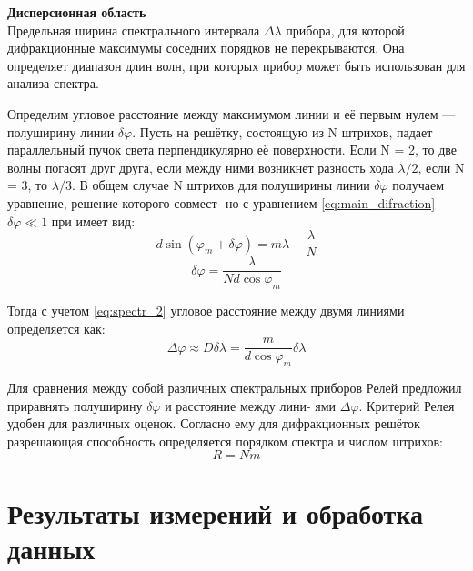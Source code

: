 \textbf{Дисперсионная область}\\
\indent Предельная ширина спектрального интервала $\Delta \lambda$ прибора, для которой дифракционные максимумы соседних порядков не перекрываются. Она определяет диапазон длин волн, при которых прибор может быть использован для
анализа спектра.

\indent Определим угловое расстояние между максимумом линии и её первым нулем — полуширину линии $\delta \varphi$. Пусть на решётку, состоящую из N штрихов, падает параллельный пучок света перпендикулярно её поверхности. Если
N = 2, то две волны погасят друг друга, если между ними возникнет
разность хода $\lambda/2$, если N = 3, то $\lambda/3$. В общем случае N штрихов для полуширины линии $\delta \varphi$ получаем уравнение, решение которого совмест-
но с уравнением \ref{eq:main_difraction} $\delta \varphi \ll 1$ при имеет вид:
\begin{equation}
    d\sin(\varphi_m + \delta \varphi) = m\lambda + \frac{\lambda}{N}
\end{equation}
\begin{equation}
    \delta \varphi = \frac{\lambda}{Nd\cos\varphi_m}
\end{equation}

\indent Тогда с учетом \ref{eq:spectr_2} угловое расстояние между двумя линиями определяется как:
\begin{equation}
    \Delta \varphi \approx D\delta \lambda = \frac{m}{d\cos\varphi_m}\delta \lambda
\end{equation}

\indent Для сравнения между собой различных спектральных приборов Релей предложил приравнять полуширину $\delta \varphi$ и расстояние между лини-
ями $\Delta \varphi$. Критерий Релея удобен для различных оценок. Согласно ему для дифракционных решёток разрешающая способность определяется порядком спектра и числом штрихов:
\begin{equation}
    R = N m
    \label{eq:Reley}
\end{equation}

\section*{Результаты измерений и обработка данных}

